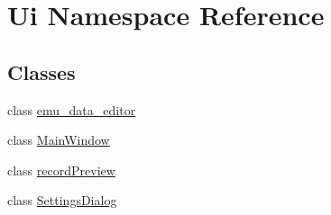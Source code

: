 \hypertarget{a00055}{\section{Ui Namespace Reference}
\label{a00055}
}
\subsection*{Classes}
\begin{DoxyCompactItemize}
\item 
class \hyperlink{a00005}{emu\+\_\+data\+\_\+editor}
\item 
class \hyperlink{a00007}{Main\+Window}
\item 
class \hyperlink{a00021}{record\+Preview}
\item 
class \hyperlink{a00023}{Settings\+Dialog}
\end{DoxyCompactItemize}

